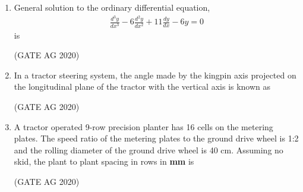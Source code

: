 \documentclass[journal]{IEEEtran}
\begin{document}
\begin{enumerate}
\medskip

\item 
General solution to the ordinary differential equation,
\begin{align*}
\frac{d^3y}{dx^3} - 6 \frac{d^2y}{dx^2} + 11 \frac{dy}{dx} - 6y = 0
\end{align*}
is
\begin{enumerate}
\end{enumerate}
\hfill(GATE AG 2020)\\

\medskip

\item 
In a tractor steering system, the angle made by the kingpin axis projected on the longitudinal plane of the tractor with the vertical axis is known as
\begin{enumerate}
\end{enumerate}
\hfill(GATE AG 2020)\\

\medskip

\item 
A tractor operated 9-row precision planter has 16 cells on the metering plates. The speed ratio of the metering plates to the ground drive wheel is 1:2 and the rolling diameter of the ground drive wheel is 40 cm. Assuming no skid, the plant to plant spacing in rows in \textbf{mm} is
\begin{enumerate}
\end{enumerate}
\hfill(GATE AG 2020)\\


\end{enumerate}
\end{document}
